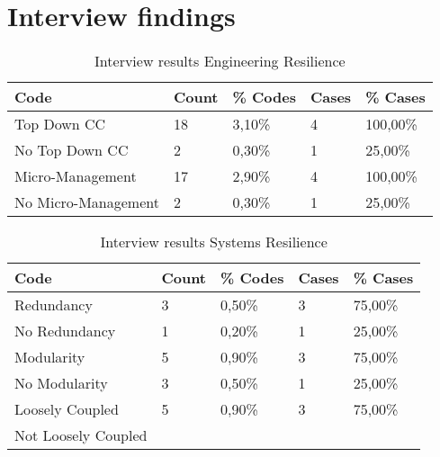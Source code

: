 \chapter{Interview findings}

\begin{table}[htbp]
	\centering
	\begin{tabular}{lllll}
		\toprule
		\textbf{Code} & \multicolumn{1}{l}{\textbf{Count}} & \multicolumn{1}{l}{\textbf{\% Codes}} & \multicolumn{1}{l}{\textbf{Cases}} & \multicolumn{1}{l}{\textbf{\% Cases}} \\
		\midrule
		Top Down CC &  18    & 3,10\% & 4     & 100,00\% \\
		No Top Down CC & 2     & 0,30\% & 1     & 25,00\% \\
		Micro-Management & 17    & 2,90\% & 4     & 100,00\% \\
		No Micro-Management & 2     & 0,30\% & 1     & 25,00\% \\
		\bottomrule
	\end{tabular}%
	\caption{Interview results Engineering Resilience}
	\label{tab:interviewresultsengineeringresilience}%
\end{table}%

\begin{table}[htbp]
	\centering
	\begin{tabular}{lllll}
		\toprule
		\textbf{Code} & \textbf{Count} & \textbf{\% Codes} &\textbf{Cases} & \textbf{\% Cases} \\
		\midrule
		Redundancy & 3     & 0,50\% & 3     & 75,00\% \\
		No Redundancy & 1     & 0,20\% & 1     & 25,00\% \\
		Modularity & 5     & 0,90\% & 3     & 75,00\% \\
		No Modularity & 3     & 0,50\% & 1     & 25,00\% \\
		Loosely Coupled & 5     & 0,90\% & 3     & 75,00\% \\
		Not Loosely Coupled &       &       &       &  \\
		\bottomrule
	\end{tabular}%
		\caption{Interview results Systems Resilience}%
	\label{tab:interviewresults Systems Resilience}%
\end{table}%

